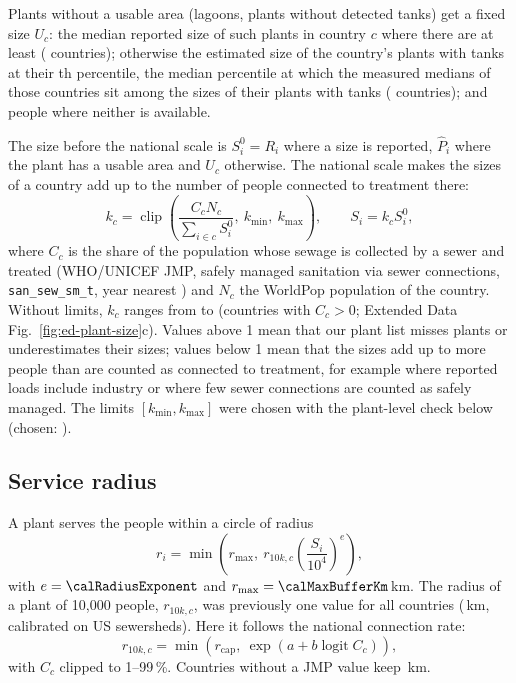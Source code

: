 Plants without a usable area (lagoons, plants without detected tanks) get a fixed size $U_c$: the
median reported size of such plants in country $c$ where there are at least \calOffsetMinPlants{}
(\calUnsizedOwn{} countries); otherwise the estimated size of the country's plants with tanks at
their \calUnsizedQuantile{}th percentile, the median percentile at which the measured medians of those
countries sit among the sizes of their plants with tanks (\calUnsizedQuantileCountries{} countries); and
\calUnsizedDefault{} people where neither is available.

The size before the national scale is $S^{0}_i = R_i$ where a size is reported, $\hat P_i$ where the
plant has a usable area and $U_c$ otherwise. The national scale makes the sizes of a country add up
to the number of people connected to treatment there:
\begin{equation}
  k_c = \operatorname{clip}\!\left(\frac{C_c N_c}{\sum_{i \in c} S^{0}_i},\ k_{\min},\ k_{\max}\right),
  \qquad S_i = k_c S^{0}_i ,
  \label{eq:scale}
\end{equation}
where $C_c$ is the share of the population whose sewage is collected by a sewer and treated (WHO/UNICEF
JMP, safely managed sanitation via sewer connections, \texttt{san\_sew\_sm\_t}, year nearest
\calYear)\cite{jmp2025} and $N_c$ the WorldPop \calYear{} population of the country\cite{worldpop}.
Without limits, $k_c$ ranges from \calScaleRawMin{} to \calScaleRawMax{} (countries with $C_c>0$; Extended Data Fig.~\ref{fig:ed-plant-size}c).
Values above 1 mean that our plant list misses plants or underestimates their sizes; values below 1
mean that the sizes add up to more people than are counted as connected to treatment, for example where
reported loads include industry or where few sewer connections are counted as safely managed. The limits $[k_{\min}, k_{\max}]$ were chosen with the plant-level
check below (chosen: \calScaleChosen).

\subsection*{Service radius}

A plant serves the people within a circle of radius
\begin{equation}
  r_i = \min\!\left(r_{\max},\ r_{10k,c} \left(\frac{S_i}{10^{4}}\right)^{e}\right),
  \label{eq:radius}
\end{equation}
with $e=\calRadiusExponent$ and $r_{\max}=\calMaxBufferKm$\,km. The radius of a plant of
10{,}000 people, $r_{10k,c}$, was previously one value for all countries (\calFixedRadius\,km,
calibrated on US sewersheds). Here it follows the national connection rate:
\begin{equation}
  r_{10k,c} = \min\!\left(r_{\mathrm{cap}},\ \exp\!\left(a + b \operatorname{logit} C_c\right)\right),
  \label{eq:rule}
\end{equation}
with $C_c$ clipped to 1--99\,\%. Countries without a JMP value keep \calFixedRadius\,km.

